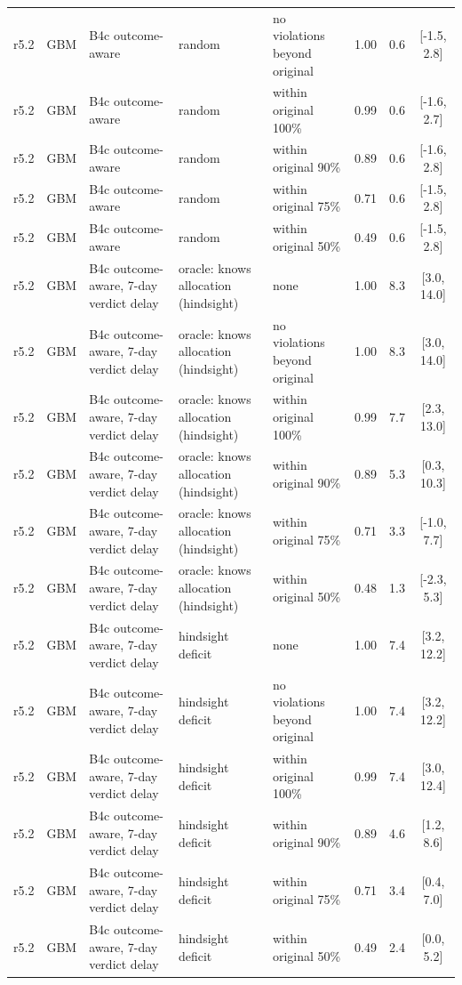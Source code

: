 \documentclass[10pt,onecolumn,letterpaper]{article}
\begin{document}
\begin{longtable}{lllp{4.2cm}p{3.4cm}ccc}
r5.2 & GBM & B4c outcome-aware & random & no violations beyond original & 1.00 & 0.6 & [-1.5, 2.8] \\
r5.2 & GBM & B4c outcome-aware & random & within original 100\% & 0.99 & 0.6 & [-1.6, 2.7] \\
r5.2 & GBM & B4c outcome-aware & random & within original 90\% & 0.89 & 0.6 & [-1.6, 2.8] \\
r5.2 & GBM & B4c outcome-aware & random & within original 75\% & 0.71 & 0.6 & [-1.5, 2.8] \\
r5.2 & GBM & B4c outcome-aware & random & within original 50\% & 0.49 & 0.6 & [-1.5, 2.8] \\
r5.2 & GBM & B4c outcome-aware, 7-day verdict delay & oracle: knows allocation (hindsight) & none & 1.00 & 8.3 & [3.0, 14.0] \\
r5.2 & GBM & B4c outcome-aware, 7-day verdict delay & oracle: knows allocation (hindsight) & no violations beyond original & 1.00 & 8.3 & [3.0, 14.0] \\
r5.2 & GBM & B4c outcome-aware, 7-day verdict delay & oracle: knows allocation (hindsight) & within original 100\% & 0.99 & 7.7 & [2.3, 13.0] \\
r5.2 & GBM & B4c outcome-aware, 7-day verdict delay & oracle: knows allocation (hindsight) & within original 90\% & 0.89 & 5.3 & [0.3, 10.3] \\
r5.2 & GBM & B4c outcome-aware, 7-day verdict delay & oracle: knows allocation (hindsight) & within original 75\% & 0.71 & 3.3 & [-1.0, 7.7] \\
r5.2 & GBM & B4c outcome-aware, 7-day verdict delay & oracle: knows allocation (hindsight) & within original 50\% & 0.48 & 1.3 & [-2.3, 5.3] \\
r5.2 & GBM & B4c outcome-aware, 7-day verdict delay & hindsight deficit & none & 1.00 & 7.4 & [3.2, 12.2] \\
r5.2 & GBM & B4c outcome-aware, 7-day verdict delay & hindsight deficit & no violations beyond original & 1.00 & 7.4 & [3.2, 12.2] \\
r5.2 & GBM & B4c outcome-aware, 7-day verdict delay & hindsight deficit & within original 100\% & 0.99 & 7.4 & [3.0, 12.4] \\
r5.2 & GBM & B4c outcome-aware, 7-day verdict delay & hindsight deficit & within original 90\% & 0.89 & 4.6 & [1.2, 8.6] \\
r5.2 & GBM & B4c outcome-aware, 7-day verdict delay & hindsight deficit & within original 75\% & 0.71 & 3.4 & [0.4, 7.0] \\
r5.2 & GBM & B4c outcome-aware, 7-day verdict delay & hindsight deficit & within original 50\% & 0.49 & 2.4 & [0.0, 5.2] \\

\end{longtable}
\end{document}
